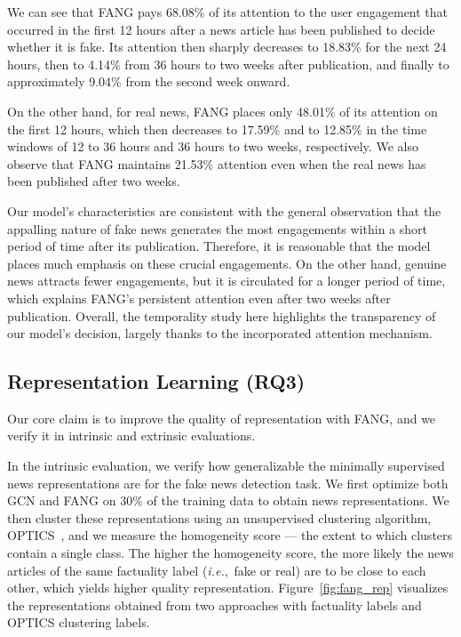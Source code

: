 \documentclass[sigconf]{acmart}
\theoremstyle{definition}
\theoremstyle{hypothesis}
\begin{document}
We can see that FANG pays 68.08\% of its attention to the user engagement that occurred in the first 12 hours after a news article has been published to decide whether it is fake. Its attention then sharply decreases to 18.83\% for the next 24 hours, then to 4.14\% from 36 hours to two weeks after publication, and finally to approximately 9.04\% from the second week onward. 

On the other hand, for real news, FANG places only 48.01\% of its attention on the first 12 hours, which then decreases to 17.59\% and to 12.85\% in the time windows of 12 to 36 hours and 36 hours to two weeks, respectively. We also observe that FANG maintains 21.53\% attention even when the real news has been published after two weeks.

Our model's characteristics are consistent with the general observation that the appalling nature of fake news generates the most engagements within a short period of time after its publication. Therefore, it is reasonable that the model places much emphasis on these crucial engagements. On the other hand, genuine news attracts fewer engagements, but it is circulated for a longer period of time, which explains FANG's persistent attention even after two weeks after publication. Overall, the temporality study here highlights the transparency of our model's decision, largely thanks to the incorporated attention mechanism. 

\subsection{Representation Learning (RQ3)}

Our core claim is to improve the quality of representation with FANG, and we verify it in intrinsic and extrinsic evaluations. 

In the intrinsic evaluation, we verify how generalizable the minimally supervised news representations are for the fake news detection task. We first optimize both GCN and FANG on 30\% of the training data to obtain news representations. We then cluster these representations using an unsupervised clustering algorithm, OPTICS~\cite{ankerst1999optics}, and we measure the homogeneity score --- the extent to which clusters contain a single class. 
The higher the homogeneity score, the more likely the news articles of the same factuality label (\textit{i.e.},~fake or real) are to be close to each other, 
which yields higher quality representation. Figure~\ref{fig:fang_rep} visualizes the representations obtained from two approaches with factuality labels and OPTICS clustering labels. 
\end{document}
